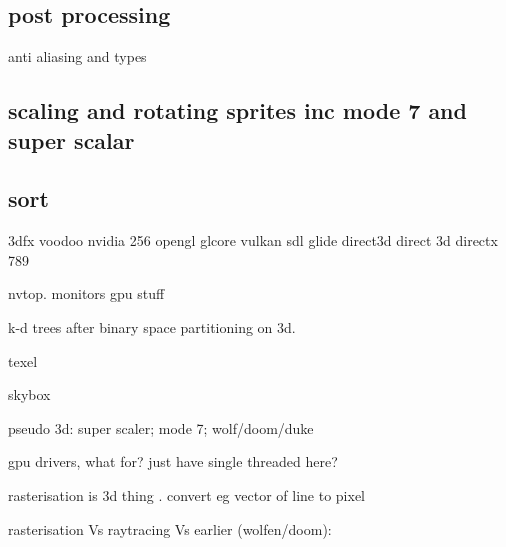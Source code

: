 \subsection{post processing}

anti aliasing and types


\subsection{scaling and rotating sprites inc mode 7 and super scalar}

\subsection{sort}


3dfx voodoo
nvidia 256
opengl
glcore
vulkan
sdl
glide
direct3d
direct 3d
directx 789

nvtop. monitors gpu stuff

k-d trees after binary space partitioning on 3d.

texel

skybox

pseudo 3d: super scaler; mode 7; wolf/doom/duke


gpu drivers, what for?
just have single threaded here?

rasterisation is 3d thing . convert eg vector of line to pixel

rasterisation Vs raytracing Vs earlier (wolfen/doom):



